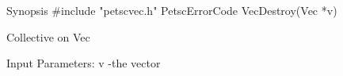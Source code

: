Synopsis
#include "petscvec.h"
PetscErrorCode  VecDestroy(Vec *v)

Collective on Vec

Input Parameters:
v -the vector
